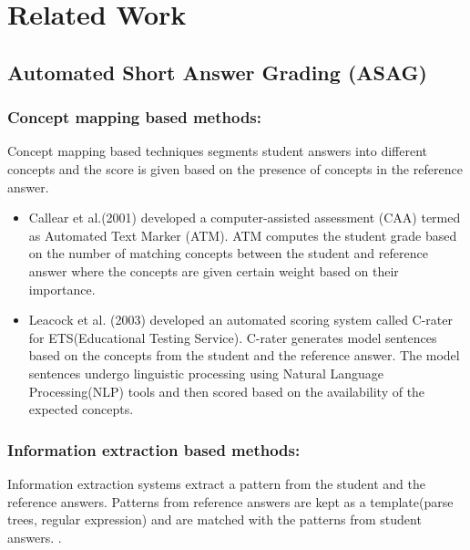 

\chapter{Related Work}

\section{Automated Short Answer Grading (ASAG)}
	
\subsection{Concept mapping based methods:}

Concept mapping based techniques segments student answers into different concepts and the score is given based on the presence of concepts in the reference answer. \cite{Burrows2015}


\begin{itemize}
	\item Callear et al.(2001) \cite{Callear2001}    developed a  computer-assisted assessment (CAA) termed as Automated Text Marker (ATM). ATM computes the student grade based on the number of matching concepts between the student and reference answer where the concepts are given certain weight based on their importance.
	
	
	\item Leacock et al. (2003)\cite{Leacock2003} developed an automated scoring system called C-rater for ETS(Educational Testing Service). C-rater generates model sentences based on the concepts from the student and the reference answer. The model sentences undergo linguistic processing using Natural Language Processing(NLP) tools and then scored based on the availability of the expected concepts. 
	
\end{itemize}

\subsection{Information extraction based methods:}

Information extraction systems extract a pattern from the student and the reference answers. Patterns from reference answers are kept as a template(parse trees, regular expression) and are matched with the patterns from student answers. \cite{Burrows2015}.


